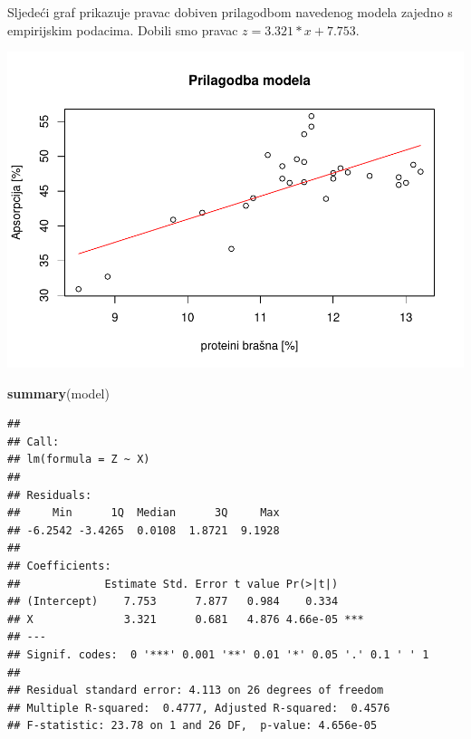 \documentclass[]{article}
\newenvironment{Shaded}{\begin{snugshade}}{\end{snugshade}}
\newcommand{\KeywordTok}[1]{\textcolor[rgb]{0.13,0.29,0.53}{\textbf{{#1}}}}
\newcommand{\DataTypeTok}[1]{\textcolor[rgb]{0.13,0.29,0.53}{{#1}}}
\newcommand{\StringTok}[1]{\textcolor[rgb]{0.31,0.60,0.02}{{#1}}}
\newcommand{\NormalTok}[1]{{#1}}
\begin{document}
Sljedeći graf prikazuje pravac dobiven prilagodbom navedenog modela
zajedno s empirijskim podacima. Dobili smo pravac
\(z = 3.321*x + 7.753\).

\begin{Shaded}
\end{Shaded}

\includegraphics{Izvjestaj_files/figure-latex/unnamed-chunk-28-1.pdf}

\begin{Shaded}
\begin{Highlighting}[]
\KeywordTok{summary}\NormalTok{(model)}
\end{Highlighting}
\end{Shaded}

\begin{verbatim}
## 
## Call:
## lm(formula = Z ~ X)
## 
## Residuals:
##     Min      1Q  Median      3Q     Max 
## -6.2542 -3.4265  0.0108  1.8721  9.1928 
## 
## Coefficients:
##             Estimate Std. Error t value Pr(>|t|)    
## (Intercept)    7.753      7.877   0.984    0.334    
## X              3.321      0.681   4.876 4.66e-05 ***
## ---
## Signif. codes:  0 '***' 0.001 '**' 0.01 '*' 0.05 '.' 0.1 ' ' 1
## 
## Residual standard error: 4.113 on 26 degrees of freedom
## Multiple R-squared:  0.4777, Adjusted R-squared:  0.4576 
## F-statistic: 23.78 on 1 and 26 DF,  p-value: 4.656e-05
\end{verbatim}
\end{document}
